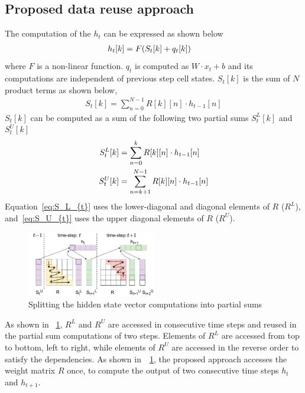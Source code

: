 \documentclass[a4paper,10pt]{article}
\begin{document}
\subsection{Proposed data reuse approach}
The computation of the $h_t$ can be expressed as shown below
\begin{align}\label{eq:h_{t}}
	h_{t}[k] &= F( S_{t}[k]+q_{t}[k])
\end{align}
where $F$ is a non-linear function. $q_{t}$ is computed as $W{\cdot}x_t{+}b$ and its computations are independent of previous step cell states. $S_{t}[k]$ is the sum of $N$ product terms as shown below,
\begin{align}
	S_{t}[k] = \sum_{n=0}^{N-1}R[k][n]\cdot h_{t-1}[n]
\end{align}
$S_{t}[k]$ can be computed as a sum of the following two partial sums $S_{t}^{L}[k]$ and $S_{t}^{U}[k]$
\begin{align}      
	S_{t}^{L}[k] &= \sum_{n=0}^{k}R[k][n]\cdot h_{t-1}[n] \label{eq:S_L_{t}}\\
	S_{t}^{U}[k] &= \sum_{n=k+1}^{N-1}R[k][n]\cdot h_{t-1}[n] \label{eq:S_U_{t}}
\end{align}
Equation~\eqref{eq:S_L_{t}} uses the lower-diagonal and diagonal elements of $R$ ($R^L$), and~\eqref{eq:S_U_{t}} uses the upper diagonal elements of $R$ ($R^U$). 
\begin{figure}[!htb]
    \captionsetup{font=sf}
	\centerline{\includegraphics[width=0.5\textwidth]{TwoTimeSteps.pdf}}
	\caption{Splitting the hidden state vector computations into partial sums}
	\label{fig:TwoTimeStepsComputation}
\end{figure}
As shown in \figurename{~\ref{fig:TwoTimeStepsComputation}}, $R^L$ and $R^U$ are accessed in consecutive time steps and reused in the partial sum computations of two steps. 
Elements of $R^L$ are accessed from top to bottom, left to right, while elements of $R^U$ are accessed in the reverse order to satisfy the dependencies. As shown in~\figurename{~\ref{fig:TwoTimeStepsComputation}}, the proposed approach accesses the weight matrix $R$ once, to compute the output of two consecutive time steps $h_{t}$ and $h_{t+1}$. 
\end{document}
